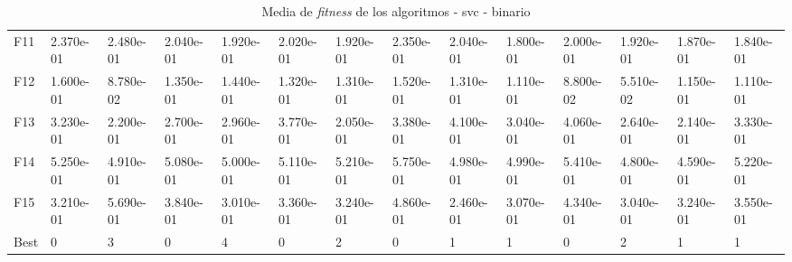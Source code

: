 \begin{table}
\begin{adjustbox}{width=\linewidth}
\begin{tabular}{llllllllllllll}
            F11  & 2.370e-01 & 2.480e-01 & 2.040e-01 & 1.920e-01 & 2.020e-01 & 1.920e-01 & 2.350e-01 & 2.040e-01 & 1.800e-01 & 2.000e-01 & 1.920e-01 & 1.870e-01 & 1.840e-01 \\
            F12  & 1.600e-01 & 8.780e-02 & 1.350e-01 & 1.440e-01 & 1.320e-01 & 1.310e-01 & 1.520e-01 & 1.310e-01 & 1.110e-01 & 8.800e-02 & 5.510e-02 & 1.150e-01 & 1.110e-01 \\
            F13  & 3.230e-01 & 2.200e-01 & 2.700e-01 & 2.960e-01 & 3.770e-01 & 2.050e-01 & 3.380e-01 & 4.100e-01 & 3.040e-01 & 4.060e-01 & 2.640e-01 & 2.140e-01 & 3.330e-01 \\
            F14  & 5.250e-01 & 4.910e-01 & 5.080e-01 & 5.000e-01 & 5.110e-01 & 5.210e-01 & 5.750e-01 & 4.980e-01 & 4.990e-01 & 5.410e-01 & 4.800e-01 & 4.590e-01 & 5.220e-01 \\
            F15  & 3.210e-01 & 5.690e-01 & 3.840e-01 & 3.010e-01 & 3.360e-01 & 3.240e-01 & 4.860e-01 & 2.460e-01 & 3.070e-01 & 4.340e-01 & 3.040e-01 & 3.240e-01 & 3.550e-01 \\
            Best & 0         & 3         & 0         & 4         & 0         & 2         & 0         & 1         & 1         & 0         & 2         & 1         & 1         \\
            \bottomrule
        \end{tabular}
    \end{adjustbox}
    \caption{Media de \textit{fitness} de los algoritmos - svc - binario}
    \label{tab:mean_fitness_bin_svc}
\end{table}


